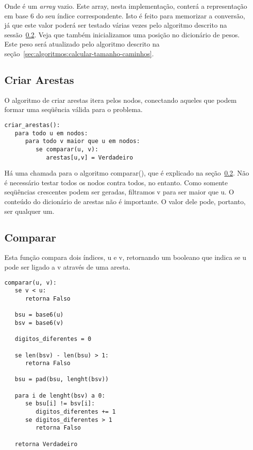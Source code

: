 \documentclass[12pt]{article}
\begin{document}
Onde {\sf []} é um \textit{array} vazio. Este array, nesta implementa\c{c}ão, conterá a representa\c{c}ão em base 6 do seu índice correspondente. Isto é feito para memorizar a conversão, já que este valor poderá ser testado várias vezes pelo algoritmo descrito na sessão~\ref{sec:algoritmos:comparar}.
Veja que também inicializamos uma posi\c{c}ão no dicionário de pesos. Este peso será atualizado pelo algoritmo descrito na se\c{c}ão~\ref{sec:algoritmos:calcular-tamanho-caminhos}.

\subsection{Criar Arestas}\label{sec:algoritmos:criar-arestas}
O algoritmo de criar arestas itera pelos nodos, conectando aqueles que podem formar uma seqüência válida para o problema.
\begin{lstlisting}
criar_arestas():
   para todo u em nodos:
      para todo v maior que u em nodos:
         se comparar(u, v):
            arestas[u,v] = Verdadeiro
\end{lstlisting}

Há uma chamada para o algoritmo {\sf comparar()}, que é explicado na se\c{c}ão~\ref{sec:algoritmos:comparar}.
Não é necessário testar todos os nodos contra todos, no entanto. Como somente seqüências crescentes podem ser geradas, filtramos {\sf v} para ser maior que {\sf u}.
O conteúdo do dicionário de arestas não é importante. O valor dele pode, portanto, ser qualquer um.

\subsection{Comparar}\label{sec:algoritmos:comparar}
Esta fun\c{c}ão compara dois índices, {\sf u} e {\sf v}, retornando um booleano que indica se {\sf u} pode ser ligado a {\sf v} através de uma aresta.
\begin{lstlisting}
comparar(u, v):
   se v < u:
      retorna Falso

   bsu = base6(u)
   bsv = base6(v)

   digitos_diferentes = 0

   se len(bsv) - len(bsu) > 1:
      retorna Falso

   bsu = pad(bsu, lenght(bsv))

   para i de lenght(bsv) a 0:
      se bsu[i] != bsv[i]:
         digitos_diferentes += 1
      se digitos_diferentes > 1
         retorna Falso

   retorna Verdadeiro
\end{lstlisting}
\end{document}
